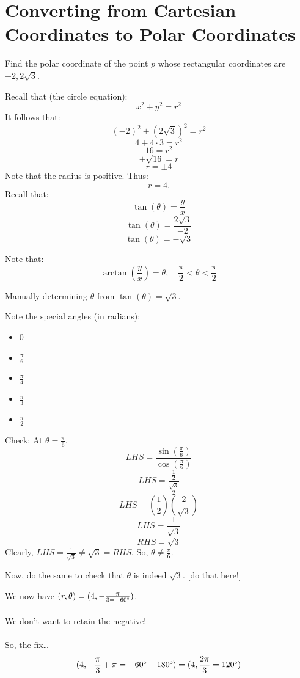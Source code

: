 \documentclass{article}
\begin{document}
\section*{Converting from Cartesian Coordinates to Polar Coordinates}
\begin{examplebox}
Find the polar coordinate of the point \( p \) whose rectangular coordinates are \( -2, 2\sqrt{3} \).

\begin{solutionbox}
Recall that (the circle equation):
\[
    x^2 + y^2 = r^2
\]
It follows that:
\[
    (-2)^2 + (2\sqrt{3})^2 = r^2
\]
\[
    4 + 4 \cdot 3 = r^2
\]
\[
    16 = r^2
\]
\[
    \pm \sqrt{16} = r 
\]
\[
    r = \pm 4
\]
Note that the radius is positive. Thus:
\[
    r = 4 \text{.}
\]
Recall that:
\[
    \tan(\theta) = \frac{y}{x}
\]
\[
    \tan(\theta) = \frac{2\sqrt{3}}{-2}
\]
\[
    \tan(\theta) = -\sqrt{3}
\]
\begin{notebox}
Note that:
\[
    \arctan(\frac{y}{x}) = \theta, \quad \frac{\pi}{2} < \theta < \frac{\pi}{2}
\]
\end{notebox}
\begin{tipbox}
Manually determining \( \theta \) from \( \tan(\theta) = \sqrt{3} \).

Note the special angles (in radians):
\begin{itemize}
    \item \( 0 \) 
    \item \( \frac{\pi}{6} \) 
    \item \( \frac{\pi}{4} \)
    \item \( \frac{\pi}{3} \)
    \item \( \frac{\pi}{2} \)
\end{itemize}
Check:
At \( \theta = \frac{\pi}{6} \),
\[
    LHS = \dfrac{\sin(\frac{\pi}{6})}{\cos(\frac{\pi}{6})}
\]
\[
    LHS = \dfrac{\frac{1}{2}}{\frac{\sqrt{3}}{2}}
\]
\[
    LHS = (\dfrac{1}{2})(\dfrac{2}{\sqrt{3}})
\]
\[
    LHS = \frac{1}{\sqrt{3}}
\]
\[
    RHS = \sqrt{3}
\]
Clearly, \( LHS = \frac{1}{\sqrt{3}} \neq \sqrt{3} = RHS \).
So, \( \theta \neq \frac{\pi}{6} \).

Now, do the same to check that \( \theta \) is indeed \( \sqrt{3} \).
[do that here!]
\end{tipbox}

We now have \( (r, \theta) = (4, -\frac{\pi}{3 = -60\text{\textdegree}})\). \\
\\
We don't want to retain the negative! \\
\\
So, the fix\dots
\[
    (4, -\frac{\pi}{3} + \pi = -60\text{\textdegree} + 180\text{\textdegree}) = (4, \frac{2\pi}{3} = 120\text{\textdegree})
\]
\end{solutionbox}
\end{examplebox}
\end{document}
